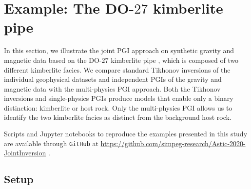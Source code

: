 \documentclass[extra, mreferee]{gji_joint} %
\begin{document}
\section{Example: The DO-$27$ kimberlite pipe} \label{TKC}

In this section, we illustrate the joint PGI approach on synthetic gravity and magnetic data based on the DO-$27$ kimberlite pipe \citep{JansenEtAl2004}, which is composed of two different kimberlite facies. We compare standard Tikhonov inversions of the individual geophysical datasets and independent PGIs of the gravity and magnetic data with the multi-physics PGI approach. Both the Tikhonov inversions and single-physics PGIs produce models that enable only a binary distinction: kimberlite or host rock. Only the multi-physics PGI allows us to identify the two kimberlite facies as distinct from the background host rock.

Scripts and Jupyter notebooks to reproduce the examples presented in this study are available through \texttt{GitHub} at \url{https://github.com/simpeg-research/Astic-2020-JointInversion} \citep{PGIJointExamples}.

\subsection{Setup}
\end{document}
